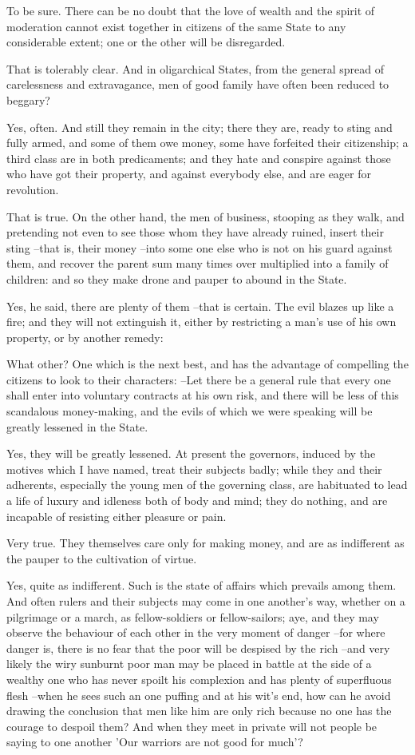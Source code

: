 To be sure.
There can be no doubt that the love of wealth and the spirit of moderation cannot exist together in citizens of the same State to any considerable extent; one or the other will be disregarded.

That is tolerably clear.
And in oligarchical States, from the general spread of carelessness and extravagance, men of good family have often been reduced to beggary?

Yes, often.
And still they remain in the city; there they are, ready to sting and fully armed, and some of them owe money, some have forfeited their citizenship; a third class are in both predicaments; and they hate and conspire against those who have got their property, and against everybody else, and are eager for revolution.

That is true.
On the other hand, the men of business, stooping as they walk, and pretending not even to see those whom they have already ruined, insert their sting --that is, their money --into some one else who is not on his guard against them, and recover the parent sum many times over multiplied into a family of children: and so they make drone and pauper to abound in the State.

Yes, he said, there are plenty of them --that is certain.
The evil blazes up like a fire; and they will not extinguish it, either by restricting a man's use of his own property, or by another remedy:

What other?
One which is the next best, and has the advantage of compelling the citizens to look to their characters: --Let there be a general rule that every one shall enter into voluntary contracts at his own risk, and there will be less of this scandalous money-making, and the evils of which we were speaking will be greatly lessened in the State.

Yes, they will be greatly lessened.
At present the governors, induced by the motives which I have named, treat their subjects badly; while they and their adherents, especially the young men of the governing class, are habituated to lead a life of luxury and idleness both of body and mind; they do nothing, and are incapable of resisting either pleasure or pain.

Very true.
They themselves care only for making money, and are as indifferent as the pauper to the cultivation of virtue.

Yes, quite as indifferent.
Such is the state of affairs which prevails among them. And often rulers and their subjects may come in one another's way, whether on a pilgrimage or a march, as fellow-soldiers or fellow-sailors; aye, and they may observe the behaviour of each other in the very moment of danger --for where danger is, there is no fear that the poor will be despised by the rich --and very likely the wiry sunburnt poor man may be placed in battle at the side of a wealthy one who has never spoilt his complexion and has plenty of superfluous flesh --when he sees such an one puffing and at his wit's end, how can he avoid drawing the conclusion that men like him are only rich because no one has the courage to despoil them? And when they meet in private will not people be saying to one another 'Our warriors are not good for much'?

